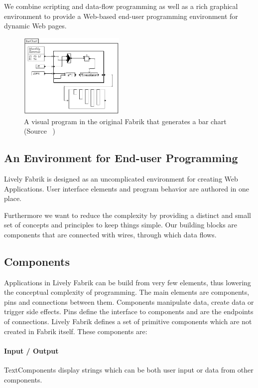 \documentclass[pdftex, times, 10pt, twocolumn]{article}
\begin{document}
We combine scripting and data-flow programming as well as a rich graphical environment to provide a Web-based end-user programming environment for dynamic Web pages.  



\begin{figure}[]\centering
\includegraphics[width=0.450000\textwidth]{Fabrik_figure6.png} 

\caption{A visual program in the original Fabrik that generates a bar chart (Source ~\cite{Ingalls1988FVP}) }
\label{fig:FabrikBarChart}
\end{figure}


\subsection{An Environment for End-user Programming}
Lively Fabrik is designed as an uncomplicated environment for creating Web Applications. User interface elements and program behavior are authored in one place.  

Furthermore we want to reduce the complexity by providing a distinct and small set of concepts and principles to keep things simple. Our building blocks are components that are connected with wires, through which data flows.  



\subsection{Components}
Applications in Lively Fabrik can be build from very few elements, thus lowering the conceptual complexity of programming. The main elements are components, pins and connections between them. Components manipulate data, create data or trigger side effects. Pins define the interface to components and are the endpoints of connections. Lively Fabrik defines a set of primitive components which are not created in Fabrik itself. These components are: 



\paragraph{Input / Output}
TextComponents display strings which can be both user input or data from other components. 
\end{document}
